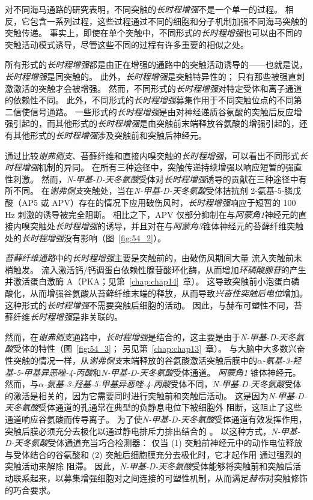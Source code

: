 对不同海马通路的研究表明，不同突触的\textit{长时程增强}不是一个单一的过程。
相反，它包含一系列过程，这些过程通过不同的细胞和分子机制加强不同海马突触的突触传递。
事实上，即使在单个突触中，不同形式的\textit{长时程增强}也可以由不同的突触活动模式诱导，尽管这些不同的过程有许多重要的相似之处。


所有形式的\textit{长时程增强}都是由正在增强的通路中的突触活动诱导的——也就是说，\textit{长时程增强}是同突触的。
此外，\textit{长时程增强}是突触特异性的；
只有那些被强直刺激激活的突触才会被增强。
然而，不同形式的\textit{长时程增强}对特定受体和离子通道的依赖性不同。 此外，不同形式的\textit{长时程增强}募集作用于不同突触位点的不同第二信使信号通路。
一些形式的\textit{长时程增强}是由对神经递质谷氨酸的突触后反应增强引起的，而其他形式的\textit{长时程增强}是由突触前末端释放谷氨酸的增强引起的，还有其他形式的\textit{长时程增强}涉及突触前和突触后神经元。


通过比较\textit{谢弗侧支}、苔藓纤维和直接内嗅突触的\textit{长时程增强}，可以看出不同形式\textit{长时程增强}机制的异同。
在所有三种途径中，突触传递持续增强以响应短暂的强直性刺激。
然而，\textit{N-甲基-D-天冬氨酸}受体对\textit{长时程增强}诱导的贡献在三种途径中有所不同。
在\textit{谢弗侧支}突触处，当在\textit{N-甲基-D-天冬氨酸}受体拮抗剂 2-氨基-5-膦戊酸（AP5 或 APV）存在的情况下应用破伤风时，\textit{长时程增强}响应于短暂的 100 Hz 刺激的诱导被完全阻断。
相比之下，APV 仅部分抑制在与\textit{阿蒙角1}神经元的直接内嗅突触处\textit{长时程增强}的诱导，并且对在与\textit{阿蒙角3}锥体神经元的苔藓纤维突触处的\textit{长时程增强}没有影响（图~\ref{fig:54_2}）。


\textit{苔藓纤维通路}中的\textit{长时程增强}主要是突触前的，由破伤风期间大量  流入突触前末梢触发。
 流入激活钙/钙调蛋白依赖性腺苷酸环化酶，从而增加\textit{环磷酸腺苷}的产生并激活蛋白激酶 A（PKA；见第~\ref{chap:chap14}~章）。
这导致突触前小泡蛋白磷酸化，从而增强谷氨酸从苔藓纤维末端的释放，从而导致\textit{兴奋性突触后电位}增加。
这种形式的\textit{长时程增强}不需要突触后细胞的活动。
因此，与赫布可塑性不同，苔藓纤维\textit{长时程增强}是非关联的。


然而，在\textit{谢弗侧支}通路中，\textit{长时程增强}是结合的，这主要是由于\textit{N-甲基-D-天冬氨酸}受体的特性（图~\ref{fig:54_3}；
另见第~\ref{chap:chap13}~章）。
与大脑中大多数兴奋性突触的情况一样，从\textit{谢弗侧支}末端释放的谷氨酸激活突触后膜中的\textit{$\alpha$-氨基-3-羟基-5-甲基异恶唑-4-丙酸}和\textit{N-甲基-D-天冬氨酸}受体通道。
\textit{阿蒙角1} 锥体神经元。
然而，与\textit{$\alpha$-氨基-3-羟基-5-甲基异恶唑-4-丙酸}受体不同，\textit{N-甲基-D-天冬氨酸}受体的激活是相关的，因为它需要同时进行突触前和突触后活动。
这是因为\textit{N-甲基-D-天冬氨酸}受体通道的孔通常在典型的负静息电位下被细胞外  阻断，这阻止了这些通道响应谷氨酸而传导离子。
为了使\textit{N-甲基-D-天冬氨酸}受体通道有效发挥作用，突触后膜必须充分去极化以通过静电排斥力排出结合的 。
以这种方式，\textit{N-甲基-D-天冬氨酸}受体通道充当巧合检测器：
仅当 (1) 突触前神经元中的动作电位释放与受体结合的谷氨酸和 (2) 突触后细胞膜充分去极化时，它才起作用 通过强烈的突触活动来解除  阻滞。
因此，\textit{N-甲基-D-天冬氨酸}受体能够将突触前和突触后活动联系起来，以募集增强细胞对之间连接的可塑性机制，从而满足\textit{赫布}对突触修饰的巧合要求。


